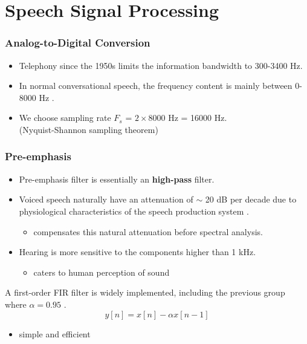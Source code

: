 \section{Speech Signal Processing}

\begin{frame}
\frametitle{Analog-to-Digital Conversion}
\begin{itemize}
\item Telephony since the 1950s limits the information bandwidth to 300-3400 Hz.
\item In normal conversational speech, the frequency content is mainly between 0-8000 Hz \cite{uysal2005bandwidth}.
\item We choose sampling rate $F_s$ = $2 \times 8000$ Hz = 16000 Hz.\\(Nyquist-Shannon sampling theorem)
\end{itemize}
\end{frame}


\begin{frame}
\frametitle{Pre-emphasis}
\begin{itemize}
\item Pre-emphasis filter is essentially an \textbf{high-pass} filter.
\vspace{15pt}
\item Voiced speech naturally have an attenuation of $\sim$ 20 dB per decade due to physiological characteristics of the speech production system \cite{picone1993signal}.
\begin{itemize}
\item compensates this natural attenuation before spectral analysis.
\end{itemize}
\item Hearing is more sensitive to the components higher than 1 kHz.
\begin{itemize}
\item caters to human perception of sound
\end{itemize}
\end{itemize}
\end{frame}


\begin{frame}
A first-order FIR filter is widely implemented, including the previous group where $\alpha = 0.95$ \cite{EVW-report}.
\begin{equation}
y[n] = x[n] - \alpha x[n-1]
\end{equation}
\begin{itemize}
\item simple and efficient
\end{itemize}
\end{frame}

